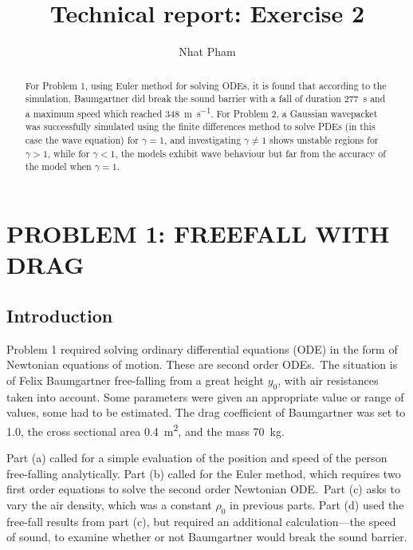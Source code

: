 \documentclass[hyphens,twocolumn,nobalancelastpage,aps,10pt,citeautoscript,longbibliography]{revtex4-2}
\begin{document}
\title{Technical report: Exercise 2}

\author{Nhat Pham}

\begin{abstract}
	For Problem 1, using Euler method for solving ODEs, it is found that
	according to the simulation, Baumgartner did break the sound barrier with a
	fall of duration \qty{277}{\second} and a maximum speed which reached
	\qty{348}{\metre\per\second}. For Problem 2, a Gaussian wavepacket was
	successfully simulated using the finite differences method to solve PDEs
	(in this case the wave equation) for $\gamma = 1$, and investigating
	$\gamma \neq 1$ shows unstable regions for $\gamma > 1$, while for $\gamma
	< 1$, the models exhibit wave behaviour but far from the accuracy of the
	model when $\gamma = 1$.
\end{abstract}

\maketitle

\section{PROBLEM 1: FREEFALL WITH DRAG}%
\label{sec:problem_1}

\subsection{Introduction}%
\label{sub:introduction_1}

\noindent Problem 1 required solving ordinary differential equations (ODE) in
the form of Newtonian equations of motion. These are second order ODEs.\ The
situation is of Felix Baumgartner free-falling from a great height $y_0$, with
air resistances taken into account. Some parameters were given an appropriate
value or range of values, some had to be estimated. The drag coefficient of
Baumgartner was set to 1.0, the cross sectional area \qty{0.4}{\metre\squared},
and the mass \qty{70}{\kilogram}.

Part (a) called for a simple evaluation of the position and speed of the person
free-falling analytically. Part (b) called for the Euler method, which requires
two first order equations to solve the second order Newtonian ODE.\ Part (c)
asks to vary the air density, which was a constant $\rho_0$ in previous parts.
Part (d) used the free-fall results from part (c), but required an additional
calculation---the speed of sound, to examine whether or not Baumgartner would
break the sound barrier.
\end{document}
